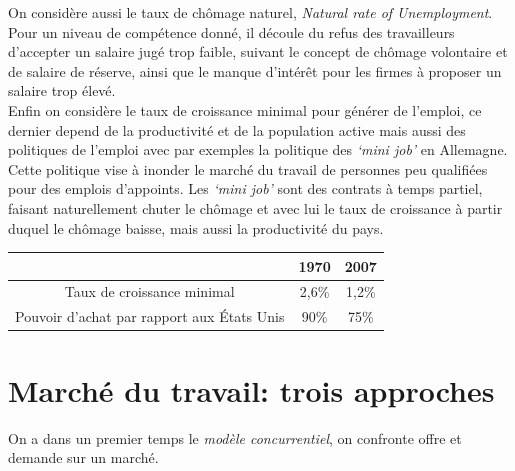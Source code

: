 \documentclass[main.tex]{subfiles}
\begin{document}
On considère aussi le taux de chômage naturel, \emph{Natural rate of Unemployment}. Pour un niveau de compétence donné, il découle du refus des travailleurs d'accepter un salaire jugé trop faible, suivant le concept de chômage volontaire et de salaire de réserve, ainsi que le manque d'intérêt pour les firmes à proposer un salaire trop élevé. \\

Enfin on considère le taux de croissance minimal pour générer de l'emploi, ce dernier depend de la productivité et de la population active mais aussi des politiques de l'emploi avec par exemples la politique des \emph{`mini job'} en Allemagne. Cette politique vise à inonder le marché du travail de personnes peu qualifiées pour des emplois d'appoints. Les \emph{`mini job'} sont des contrats à temps partiel, faisant naturellement chuter le chômage et avec lui le taux de croissance à partir duquel le chômage baisse, mais aussi la productivité du pays.
\medskip

\begin{center}
        \begin{tabular}{|*{3}{c|}}
               \hline
               & 1970 & 2007 \\
               \hline
               Taux de croissance minimal & 2,6\% & 1,2\% \\
               \hline
               Pouvoir d'achat par rapport aux États Unis & 90\% & 75\% \\
               \hline
        \end{tabular}
\end{center}

\section{Marché du travail: trois approches}

        On a dans un premier temps le \emph{modèle concurrentiel}, on confronte offre et demande sur un marché. \\
\end{document}
